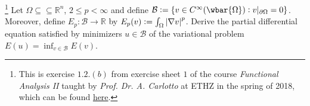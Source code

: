 \begin{exercise}\footnote{This is exercise $1.2. (b)$ from exercise sheet $1$ of the course \emph{Functional Analysis II} taught by \emph{Prof. Dr. A. Carlotto} at ETHZ in the spring of 2018, which can be found \href{https://metaphor.ethz.ch/x/2018/fs/401-3462-00L/ex/Problems01-FAII.pdf}{here}.}
	Let $\Omega \subseteq \subseteq \mathbb{R}^n$, $2 \leq p < \infty$ and define $\mathcal{B} := \cbr[0]{v \in C^\infty(\wbar{\Omega}) : v\vert_{\partial\Omega} = 0}$. Moreover, define $E_p : \mathcal{B} \to \mathbb{R}$ by $E_p(v) := \int_\Omega \abs[0]{\nabla v}^p$. Derive the partial differential equation satisfied by minimizers $u \in \mathcal{B}$ of the variational problem $E(u) = \inf_{v \in \mathcal{B}}E(v)$.	
\end{exercise}
